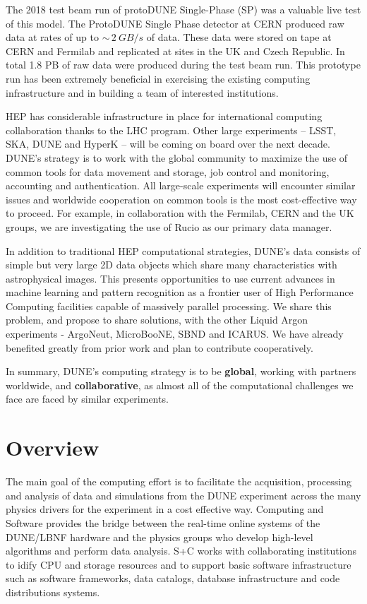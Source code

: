 The 2018 test beam run of protoDUNE Single-Phase (SP) was a valuable live test of this model.  The ProtoDUNE Single Phase detector at CERN produced raw data at rates of up to $\sim\,\SI{2}{GB/s}$ of data.  These data were stored on tape at CERN and Fermilab and replicated at sites in the UK and Czech Republic.  In total 1.8 PB of raw data were produced during the test beam run. 
This prototype run has been extremely beneficial in exercising the existing computing infrastructure and in building a team of interested institutions.

HEP has considerable infrastructure in place for international computing collaboration thanks to the LHC program.  Other large experiments -- LSST, SKA, DUNE and HyperK -- will be coming on board over the next decade.   DUNE's strategy is to work with the global community to maximize the use of common tools for data movement and storage, job control and monitoring, accounting and authentication.   All large-scale experiments will encounter similar issues and worldwide cooperation on common tools is the most cost-effective way to proceed. For example, in collaboration with the Fermilab, CERN and the UK groups, we are investigating the use of Rucio as our primary data manager.

In addition to traditional HEP computational strategies, DUNE's data consists of simple but very large 2D data objects which share many characteristics with astrophysical images.  This presents opportunities to use current advances in machine learning and pattern recognition as a frontier user of High Performance Computing facilities capable of massively parallel processing.  We share this problem, and propose to share solutions, with the other Liquid Argon experiments - ArgoNeut, MicroBooNE, SBND and ICARUS.  We have already benefited greatly from prior work and plan to contribute cooperatively.

In summary, DUNE's computing strategy is to be {\bf global}, working with partners worldwide, and {\bf collaborative}, as almost all of the computational challenges we face are faced by similar experiments. 
 


\section{Overview}		
\label{ch:exec-comp-ovr}
The main goal of the computing effort is to facilitate the acquisition, processing and analysis of data and simulations from the DUNE experiment across the many physics drivers for the experiment in a cost effective way. Computing and Software provides the bridge between the real-time online systems of the DUNE/LBNF hardware and the physics groups who develop high-level algorithms and perform data analysis. S+C works with collaborating institutions to idify CPU and storage resources and to support basic software infrastructure such as software frameworks, data catalogs, database infrastructure and code distributions systems. 

